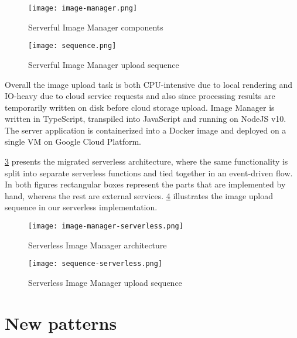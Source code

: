 \begin{figure}[h]
  \centering
  \texttt{[image: image-manager.png]}
  \caption{Serverful Image Manager components}
  \label{fig:serverfulArchitecture}
\end{figure}

\begin{figure}[h]
  \centering
  \texttt{[image: sequence.png]}
  \caption{Serverful Image Manager upload sequence}
  \label{fig:serverfulSequence}
\end{figure}

Overall the image upload task is both CPU-intensive due to local rendering and IO-heavy due to cloud service requests and also since processing results are temporarily written on disk before cloud storage upload. Image Manager is written in TypeScript, transpiled into JavaScript and running on NodeJS v10. The server application is containerized into a Docker image and deployed on a single VM on Google Cloud Platform.

\ref{fig:serverlessArchitecture} presents the migrated serverless architecture, where the same functionality is split into separate serverless functions and tied together in an event-driven flow. In both figures rectangular boxes represent the parts that are implemented by hand, whereas the rest are external services. \ref{fig:serverlessSequence} illustrates the image upload sequence in our serverless implementation.


\begin{figure}[h]
  \centering
  \texttt{[image: image-manager-serverless.png]}
  \caption{Serverless Image Manager architecture}
  \label{fig:serverlessArchitecture}
\end{figure}

\begin{figure}[h]
  \centering
  \texttt{[image: sequence-serverless.png]}
  \caption{Serverless Image Manager upload sequence}
  \label{fig:serverlessSequence}
\end{figure}

\section{New patterns} \label{sec:newPatterns}


